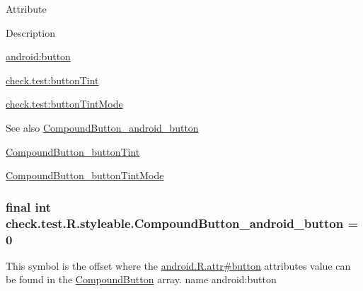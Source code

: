Attribute

Description 

{\ttfamily \hyperlink{classcheck_1_1test_1_1_r_1_1styleable_ae01e886272fd023e7246e70fe1b9f02a}{android\+:button}}

{\ttfamily \hyperlink{classcheck_1_1test_1_1_r_1_1styleable_abeac4e31561aff11337ba066d51e4a89}{check.\+test\+:button\+Tint}}

{\ttfamily \hyperlink{classcheck_1_1test_1_1_r_1_1styleable_a0c860185874a6d4eb945c0ff3ab04d68}{check.\+test\+:button\+Tint\+Mode}}

\begin{DoxySeeAlso}{See also}
\hyperlink{classcheck_1_1test_1_1_r_1_1styleable_ae01e886272fd023e7246e70fe1b9f02a}{Compound\+Button\+\_\+android\+\_\+button} 

\hyperlink{classcheck_1_1test_1_1_r_1_1styleable_abeac4e31561aff11337ba066d51e4a89}{Compound\+Button\+\_\+button\+Tint} 

\hyperlink{classcheck_1_1test_1_1_r_1_1styleable_a0c860185874a6d4eb945c0ff3ab04d68}{Compound\+Button\+\_\+button\+Tint\+Mode} 
\end{DoxySeeAlso}
\hypertarget{classcheck_1_1test_1_1_r_1_1styleable_ae01e886272fd023e7246e70fe1b9f02a}{}
\subsubsection[{Compound\+Button\+\_\+android\+\_\+button}]{\setlength{\rightskip}{0pt plus 5cm}final int check.\+test.\+R.\+styleable.\+Compound\+Button\+\_\+android\+\_\+button = 0\hspace{0.3cm}{\ttfamily [static]}}\label{classcheck_1_1test_1_1_r_1_1styleable_ae01e886272fd023e7246e70fe1b9f02a}
This symbol is the offset where the \hyperlink{}{android.\+R.\+attr\#button} attribute\textquotesingle{}s value can be found in the \hyperlink{classcheck_1_1test_1_1_r_1_1styleable_a92450249dab865f0e8cb180e69be8dcf}{Compound\+Button} array.  name android\+:button \hypertarget{classcheck_1_1test_1_1_r_1_1styleable_abeac4e31561aff11337ba066d51e4a89}{}
